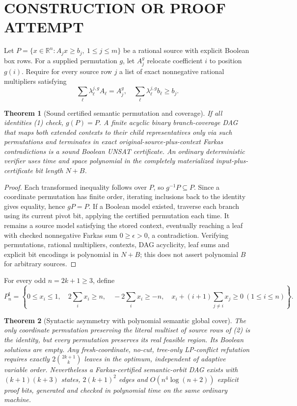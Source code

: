 \documentclass[11pt]{article}
\newtheorem{theorem}{Theorem}
\begin{document}
\section{CONSTRUCTION OR PROOF ATTEMPT}
Let $P=\{x\in\mathbb R^n:A_jx\ge b_j,\ 1\le j\le m\}$ be a rational source with explicit Boolean box rows. For a supplied permutation $g$, let $A_j^g$ relocate coefficient $i$ to position $g(i)$. Require for every source row $j$ a list of exact nonnegative rational multipliers satisfying
\[
\sum_{\ell}\lambda^{j,g}_{\ell}A_{\ell}=A_j^g,\quad
\sum_{\ell}\lambda^{j,g}_{\ell}b_{\ell}\ge b_j.\tag{1}
\]
\begin{theorem}[Sound certified semantic permutation and coverage]
If all identities (1) check, $g(P)=P$. A finite acyclic binary branch-coverage DAG that maps both extended contexts to their child representatives only via such permutations and terminates in exact original-source-plus-context Farkas contradictions is a sound Boolean UNSAT certificate. An ordinary deterministic verifier uses time and space polynomial in the completely materialized input-plus-certificate bit length $N+B$.
\end{theorem}
\begin{proof}
Each transformed inequality follows over $P$, so $g^{-1}P\subseteq P$. Since a coordinate permutation has finite order, iterating inclusions back to the identity gives equality, hence $gP=P$. If a Boolean model existed, traverse each branch using its current pivot bit, applying the certified permutation each time. It remains a source model satisfying the stored context, eventually reaching a leaf with checked nonnegative Farkas sum $0\ge\epsilon>0$, a contradiction. Verifying permutations, rational multipliers, contexts, DAG acyclicity, leaf sums and explicit bit encodings is polynomial in $N+B$; this does not assert polynomial $B$ for arbitrary sources.
\end{proof}
For every odd $n=2k+1\ge3$, define
\[
P_n^\sharp=\left\{0\le x_i\le1,\quad 2\sum_i x_i\ge n,\quad -2\sum_i x_i\ge-n,\quad x_i+(i+1)\sum_{j\ne i}x_j\ge0\ (1\le i\le n)\right\}.\tag{2}
\]
\begin{theorem}[Syntactic asymmetry with polynomial semantic global cover]
The only coordinate permutation preserving the literal multiset of source rows of (2) is the identity, but every permutation preserves its real feasible region. Its Boolean solutions are empty. Any fresh-coordinate, no-cut, tree-only LP-conflict refutation requires exactly $2\binom{2k+1}{k}$ leaves in the optimum, independent of adaptive variable order. Nevertheless a Farkas-certified semantic-orbit DAG exists with $(k+1)(k+3)$ states, $2(k+1)^2$ edges and $O(n^4\log(n+2))$ explicit proof bits, generated and checked in polynomial time on the same ordinary machine.
\end{theorem}
\end{document}
